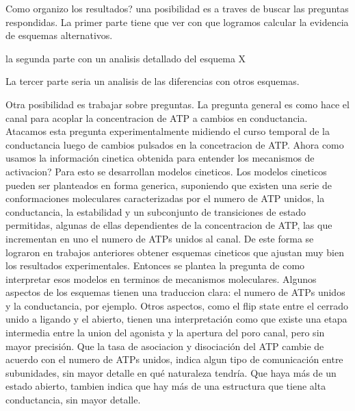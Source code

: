\documentclass[a4paper,12pt]{article}
\begin{document}
		Como organizo los resultados?
		una posibilidad es a traves de buscar las preguntas respondidas. 
		La primer parte tiene que ver con que logramos calcular la evidencia de esquemas alternativos. 
		
		la segunda parte con un analisis detallado del esquema X
		
		La tercer parte seria un analisis de las diferencias con otros esquemas. 
		
		Otra posibilidad es trabajar sobre preguntas. 
		La pregunta general es como hace el canal para acoplar la concentracion de ATP a cambios en conductancia. Atacamos esta pregunta experimentalmente midiendo el curso temporal de la conductancia luego de cambios pulsados en la concetracion de ATP. Ahora como usamos la información cinetica obtenida para entender los mecanismos de activacion? Para esto se desarrollan modelos cineticos. 
		Los modelos cineticos pueden ser planteados en forma generica, suponiendo que existen una serie de conformaciones moleculares caracterizadas por el numero de ATP unidos, la conductancia, la estabilidad y un subconjunto de transiciones de estado permitidas, algunas de ellas dependientes de la concentracion de ATP, las que incrementan en uno el numero de ATPs unidos al canal. 
		De este forma se lograron en trabajos anteriores obtener esquemas cineticos que ajustan muy bien los resultados experimentales. 
		Entonces se plantea la pregunta de como interpretar esos modelos en terminos de mecanismos moleculares. Algunos aspectos de los esquemas tienen una traduccion clara: el numero de ATPs unidos y la conductancia, por ejemplo. Otros aspectos, como el flip state entre el cerrado unido a ligando y el abierto, tienen una interpretación como que existe una etapa intermedia entre la union del agonista y la apertura del poro canal, pero sin mayor precisión. Que la tasa de asociacion y disociación del ATP cambie de acuerdo con el numero de ATPs unidos, indica algun tipo de comunicación entre subunidades, sin mayor detalle en qué naturaleza tendría. Que haya más de un estado abierto, tambien indica que hay más de una estructura que tiene alta conductancia, sin mayor detalle. 
		
\end{document}
